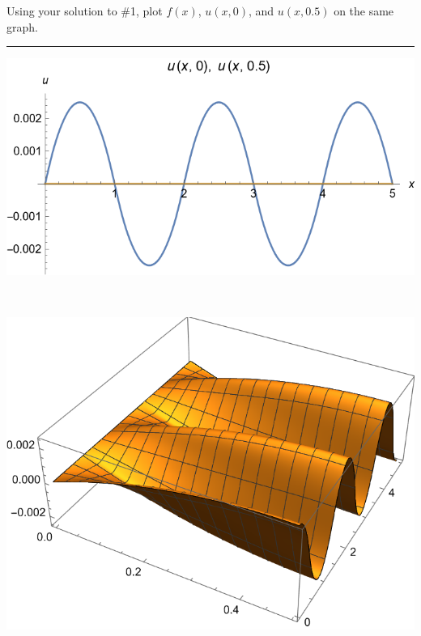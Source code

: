 \documentclass[10pt]{article}
\begin{document}
\newpage

\section{\underline{}}
\label{sec: Problem 2}

\noindent
Using your solution to \#1, plot $ f(x) $, $ u(x,0) $, and $ u(x,0.5) $ on the same graph.  \\
\vspace{2.5mm}

\hrule 

\vspace{7.5mm}
\begin{center}
    \begin{minipage}{0.75\linewidth}
        \includegraphics[width=\textwidth]{IMG/2.png}
    \end{minipage} \\
    \vspace{5mm}
    \begin{minipage}{0.75\linewidth}
        \includegraphics[width=\textwidth]{IMG/2-.png}
    \end{minipage}
\end{center}
\newpage
\end{document}
